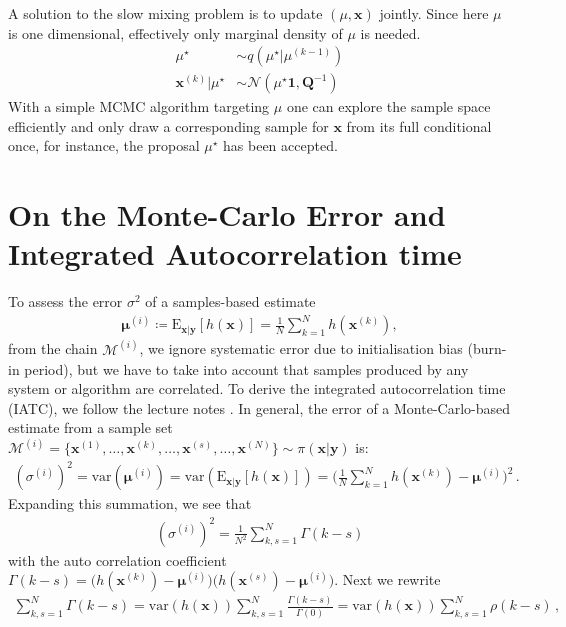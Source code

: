 A solution to the slow mixing problem is to update $(\mu, \bm{x})$ jointly.
Since here $\mu$ is one dimensional, effectively only marginal density of $\mu$ is needed.
\begin{align}
	\mu^{\star}  &\sim q (\mu^{\star}|	\mu^{(k-1)} ) \\
	\bm{x}^{(k)} | \mu^{\star} &\sim \mathcal{N} (	\mu^{\star}\bm{1}, \bm{Q}^{-1}) 
\end{align}
With a simple MCMC algorithm targeting  $ \mu$ one can explore the sample space efficiently and only draw a corresponding sample for $\bm{x}$ from its full conditional once, for instance, the proposal $\mu^{\star}$ has been accepted.

\section{On the Monte-Carlo Error and Integrated Autocorrelation time}
\label{ap:IATC}
To assess the error $\sigma^2$ of a samples-based estimate 
\begin{align}
	\bm{\mu}^{(i)} \coloneqq	\text{E}_{\bm{x}|\bm{y}} [h(\bm{x})] = \frac{1}{N} \sum_{k=1}^{N} h(\bm{x}^{(k)}),
\end{align} 
from the chain $\mathcal{M}^{(i)}$, we ignore systematic error due to initialisation bias (burn-in period), but we have to take into account that samples produced by any system or algorithm are correlated.
To derive the integrated autocorrelation time (IATC), we follow the lecture notes \cite{wolff2002LecNot}.
In general, the error of a Monte-Carlo-based estimate from a sample set $\mathcal{M}^{(i)} = \{\bm{x}^{(1)}, \dots,\bm{x}^{(k)},\dots, \bm{x}^{(s)},\dots, \bm{x}^{(N)}\} \sim \pi(\bm{x}|\bm{y})$ is:
\begin{align}
	(\sigma^{(i)})^2 = \text{var}(\bm{\mu}^{(i)}) =  \text{var}(\text{E}_{\bm{x}|\bm{y}} [h(\bm{x})]) = \Bigg( \frac{1}{N} \sum_{k=1}^{N} h(\bm{x}^{(k)}) - \bm{\mu}^{(i)} \Bigg)^2 \, .
\end{align}
Expanding this summation, we see that
\begin{align}
	(\sigma^{(i)})^2 = \frac{1}{N^2} \sum_{k,s=1}^{N} \Gamma(k-s)
\end{align}
with the auto correlation coefficient $\Gamma(k-s) =  \big( h(\bm{x}^{(k)}) - \bm{\mu}^{(i)} \big) \big(h(\bm{x}^{(s)}) - \bm{\mu}^{(i)} \big)$.
Next we rewrite
\begin{align}
	\sum_{k,s=1}^{N} \Gamma(k-s) = \text{var}(h(\bm{x}))  \sum_{k,s=1}^{N} \frac{\Gamma(k-s)}{\Gamma(0)} =  \text{var}(h(\bm{x})) \sum_{k,s=1}^{N}\rho(k-s)\, ,
\end{align}
